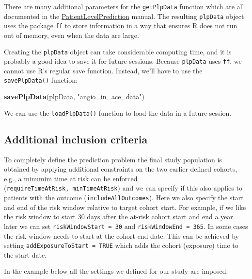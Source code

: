 \documentclass[]{book}
\newenvironment{Shaded}{\begin{snugshade}}{\end{snugshade}}
\newcommand{\KeywordTok}[1]{\textcolor[rgb]{0.13,0.29,0.53}{\textbf{#1}}}
\newcommand{\StringTok}[1]{\textcolor[rgb]{0.31,0.60,0.02}{#1}}
\newcommand{\NormalTok}[1]{#1}
\begin{document}
There are many additional parameters for the \texttt{getPlpData}
function which are all documented in the
\href{https://ohdsi.github.io/PatientLevelPrediction/}{PatientLevelPrediction}
manual. The resulting \texttt{plpData} object uses the package
\texttt{ff} to store information in a way that ensures R does not run
out of memory, even when the data are large.

Creating the \texttt{plpData} object can take considerable computing
time, and it is probably a good idea to save it for future sessions.
Because \texttt{plpData} uses \texttt{ff}, we cannot use R's regular
save function. Instead, we'll have to use the \texttt{savePlpData()}
function:

\begin{Shaded}
\begin{Highlighting}[]
\KeywordTok{savePlpData}\NormalTok{(plpData, }\StringTok{"angio_in_ace_data"}\NormalTok{)}
\end{Highlighting}
\end{Shaded}

We can use the \texttt{loadPlpData()} function to load the data in a
future session.

\subsection{Additional inclusion
criteria}\label{additional-inclusion-criteria}

To completely define the prediction problem the final study population
is obtained by applying additional constraints on the two earlier
defined cohorts, e.g., a minumim time at risk can be enforced
(\texttt{requireTimeAtRisk,\ minTimeAtRisk}) and we can specify if this
also applies to patients with the outcome (\texttt{includeAllOutcomes}).
Here we also specify the start and end of the risk window relative to
target cohort start. For example, if we like the risk window to start 30
days after the at-risk cohort start and end a year later we can set
\texttt{riskWindowStart\ =\ 30} and \texttt{riskWindowEnd\ =\ 365}. In
some cases the risk window needs to start at the cohort end date. This
can be achieved by setting \texttt{addExposureToStart\ =\ TRUE} which
adds the cohort (exposure) time to the start date.

In the example below all the settings we defined for our study are
imposed:
\end{document}
